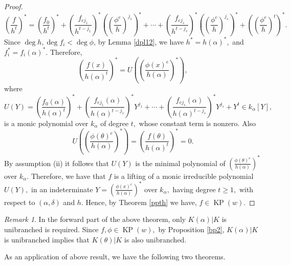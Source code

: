 \documentclass[11pt]{amsart}
\theoremstyle{definition}
\theoremstyle{remark}
\newtheorem{remark}[theorem]{Remark}
\numberwithin{equation}{section}
\begin{document}
\begin{proof}
		\[\left(\frac{f}{h^t}\right)^*=\left(\frac{f_0}{h^t}\right)^*+\left(\frac{f_{ej_1}}{h^{t-j_1}}\right)^*\left(\left(\frac{\phi^e}{h}\right)^{j_1}\right)^*+\cdots+\left(\frac{f_{ej_s}}{h^{t-j_s}}\right)^*\left(\left(\frac{\phi^e}{h}\right)^{j_s}\right)^*+\left(\left(\frac{\phi^e}{h}\right)^t\right)^*.\] Since $\deg h,\deg f_i<\deg \phi$, by Lemma \ref{dpl12}, we have $h^*=h(\alpha)^*,$ and $f_i^*=f_i(\alpha)^*.$ Therefore,  \[\left(\frac{f(x)}{h(\alpha)^t}\right)^*=U\left(\left(\frac{\phi(x)^e}{h(\alpha)}\right)^*\right),\] where \[U(Y)=\left(\frac{f_0(\alpha)}{h(\alpha)^t}\right)^*+\left(\frac{f_{ej_1}(\alpha)}{h(\alpha)^{t-j_1}}\right)^*Y^{j_1}+\cdots+\left(\frac{f_{ej_s}(\alpha)}{h(\alpha)^{t-j_s}}\right)^*Y^{j_s}+Y^t\in k_\alpha [Y],\] is a monic polynomial over $k_\alpha$ of degree $t,$ whose constant term is nonzero. Also \[U\left(\left(\frac{\phi(\theta)^e}{h(\alpha)}\right)^*\right)=\left(\frac{f(\theta)}{h(\alpha)^t}\right)^*=0.\] By assumption (ii) it follows that $U(Y)$ is the minimal polynomial of $\left(\frac{\phi(\theta)^e}{h(\alpha)}\right)^*$ over $k_\alpha.$ Therefore, we have that $f$ is a lifting of a monic irreducible polynomial $U(Y),$ in an indeterminate $Y= \left(\frac{\phi(x)^e}{h(\alpha)}\right)^*$ over $k_\alpha,$ having degree $t\geq 1,$ with respect to $(\alpha,\delta)$ and $h.$ Hence, by Theorem \ref{ppth} we have, $f\in\operatorname{KP}(w).$
	\end{proof}
	
	\begin{remark}
		In the forward part of the above theorem, only $K(\alpha)|K$ is unibranched is required. Since $f,\phi\in \operatorname{KP}(w),$ by Proposition \ref{bp2}, $K(\alpha)|K$ is unibranched implies that $K(\theta)|K$ is also unibranched.
	\end{remark}
	
	As an application of above result, we have the following two theorems.
	
\end{document}
